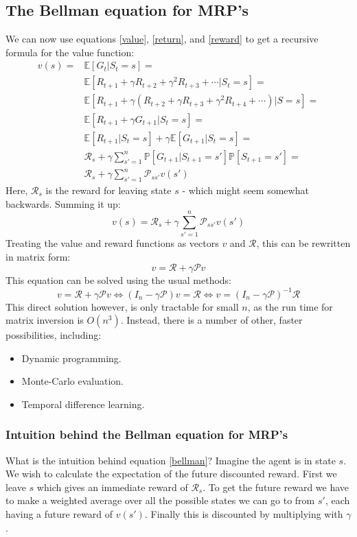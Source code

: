 \documentclass[12pt, a4paper]{article}
\numberwithin{equation}{section}
\begin{document}
\subsection{The Bellman equation for MRP's}
We can now use equations \ref{value}, \ref{return}, and \ref{reward} to get a recursive formula for the value function:
\begin{align}
v(s)=&\mathbb{E}[G_t|S_t=s]=\\
&\mathbb{E}[R_{t+1}+\gamma R_{t+2}+\gamma^2 R_{t+3}+\cdots|S_t=s]=\\
&\mathbb{E}[R_{t+1}+\gamma(R_{t+2}+\gamma R_{t+3}+\gamma^2 R_{t+4}+\cdots)|S=s]=\\
&\mathbb{E}[R_{t+1}+\gamma G_{t+1}|S_t=s]=\\
&\mathbb{E}[R_{t+1}|S_t=s]+\gamma\mathbb{E}[G_{t+1}|S_t=s]=\\
&\mathcal{R}_s+\gamma\sum_{s'=1}^n\mathbb{P}[G_{t+1}|S_{t+1}=s']\mathbb{P}[S_{t+1}=s']=\\
&\mathcal{R}_s+\gamma\sum_{s'=1}^n\mathcal{P}_{ss'}v(s')
\end{align}
Here, $\mathcal{R}_s$ is the reward for leaving state $s$ - which might seem somewhat backwards. Summing it up:
\begin{equation}
v(s)=\mathcal{R}_s+\gamma\sum_{s'=1}^n\mathcal{P}_{ss'}v(s')
\label{bellman}
\end{equation}
Treating the value and reward functions as vectors $v$ and $\mathcal{R}$, this can be rewritten in matrix form:
\begin{equation}
v=\mathcal{R}+\gamma\mathcal{P}v
\label{belmann_matrix}
\end{equation}
This equation can be solved using the usual methods:
\begin{equation}
v=\mathcal{R}+\gamma\mathcal{P}v\Leftrightarrow(I_n-\gamma\mathcal{P})v=\mathcal{R}\Leftrightarrow v=(I_n-\gamma\mathcal{P})^{-1}\mathcal{R}
\end{equation}
This direct solution however, is only tractable for small $n$, as the run time for matrix inversion is $O(n^3)$. Instead, there is a number of other, faster possibilities, including:
\begin{itemize}
\item Dynamic programming.
\item Monte-Carlo evaluation.
\item Temporal difference learning.
\end{itemize}

\subsubsection{Intuition behind the Bellman equation for MRP's}
What is the intuition behind equation \ref{bellman}? Imagine the agent is in state $s$. We wish to calculate the expectation of the future discounted reward. First we leave $s$ which gives an immediate reward of $\mathcal{R}_s$. To get the future reward we have to make a weighted average over all the possible states we can go to from $s'$, each having a future reward of $v(s')$. Finally this is discounted by multiplying with $\gamma$.
\end{document}
